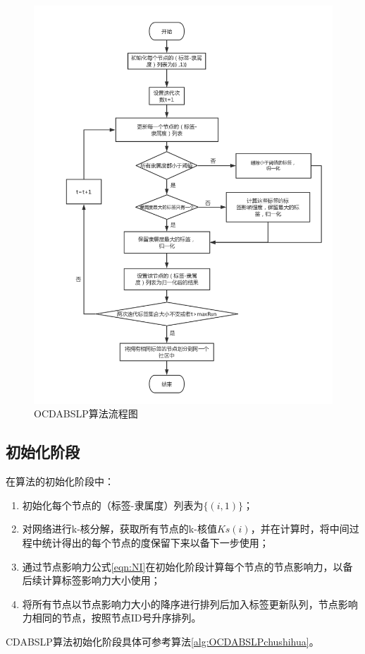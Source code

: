 \begin{figure}
  \centering
  \includegraphics[width=1\textwidth]{figures/ocdabslp}
  \caption{OCDABSLP算法流程图}\label{fig:ocdabslp}
\end{figure}

\subsection{初始化阶段}

在算法的初始化阶段中：
\begin{enumerate}
  \item 初始化每个节点的（标签-隶属度）列表为$ \{ (i,1) \} $；
  \item 对网络进行k-核分解，获取所有节点的k-核值$Ks(i)$，并在计算时，将中间过程中统计得出的每个节点的度保留下来以备下一步使用；
  \item 通过节点影响力公式\ref{eqn:NI}在初始化阶段计算每个节点的节点影响力，以备后续计算标签影响力大小使用；
  \item 将所有节点以节点影响力大小的降序进行排列后加入标签更新队列，节点影响力相同的节点，按照节点ID号升序排列。
\end{enumerate}
CDABSLP算法初始化阶段具体可参考算法\ref{alg:OCDABSLPchushihua}。

